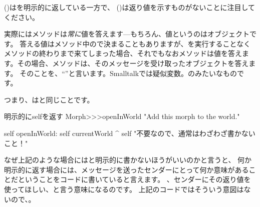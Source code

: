 \documentclass[a4paper,10pt,twoside]{book}
\begin{document}
 ()はを明示的に返している一方で、 ()は返り値を示すものがないことに注目してください。

実際にはメソッドは\emph{常に}値を答えます---もちろん、値というのはオブジェクトです。
答える値はメソッド中の\ct{^}で決まることもありますが、\ct{^}を実行することなくメソッドの終わりまで来てしまった場合、それでもなおメソッドは値を答えます。その場合、メソッドは、そのメッセージを受け取ったオブジェクトを答えます。
そのことを、``''と言います。Smalltalkでは疑似変数。のみたいなものです。

つまり、はと同じことです。

\begin{method}[openInWorldReturnSelf]{明示的にselfを返す}
Morph>>>openInWorld
	"Add this morph to the world."
	
    self openInWorld: self currentWorld
	^ self		"不要なので、通常はわざわざ書かないこと！"
\end{method}

なぜ上記のような場合にはと明示的に書かないほうがいいのかと言うと、
何か明示的に返す場合には、メッセージを送ったセンダーにとって何か意味があることだということをコードに書いていると言えます。
、センダーにその返り値を使ってほしい、と言う意味になるのです。
上記のコードではそういう意図はないので、。
\end{document}
